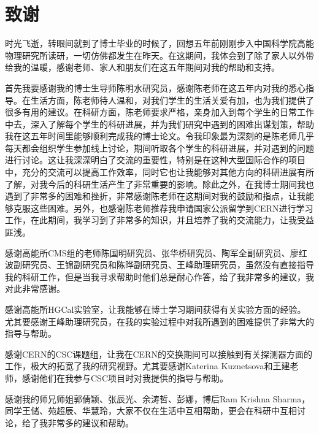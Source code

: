 \chapter[致谢]{致\quad 谢}%

时光飞逝，转眼间就到了博士毕业的时候了，回想五年前刚刚步入中国科学院高能物理研究所读研，一切仿佛都发生在昨天。在这期间，我体会到了除了家人以外带给我的温暖，感谢老师、家人和朋友们在这五年期间对我的帮助和支持。

首先我要感谢我的博士生导师陈明水研究员，感谢陈老师在这五年内对我的悉心指导。在生活方面，陈老师待人温和，对我们学生的生活关爱有加，也为我们提供了很多有用的建议。在科研方面，陈老师要求严格，亲身加入到每个学生的日常工作中去，深入了解每个学生的科研进展，并为我们研究中遇到的困难出谋划策，帮助我在这五年时间里能够顺利完成我的博士论文。令我印象最为深刻的是陈老师几乎每天都会组织学生参加线上讨论，期间听取各个学生的科研进展，并对遇到的问题进行讨论。这让我深深明白了交流的重要性，特别是在这种大型国际合作的项目中，充分的交流可以提高工作效率，同时它也让我能够对其他方向的科研进展有所了解，对我今后的科研生活产生了非常重要的影响。除此之外，在我博士期间我也遇到了非常多的困难和挫折，非常感谢陈老师在这期间对我的鼓励和指点，让我能够克服这些困难。另外，也感谢陈老师推荐我申请国家公派留学到CERN进行学习工作，在此期间，我学习到了非常多的知识，并且培养了我的交流能力，让我受益匪浅。

感谢高能所CMS组的老师陈国明研究员、张华桥研究员、陶军全副研究员、廖红波副研究员、王锦副研究员和陈晔副研究员、王峰助理研究员，虽然没有直接指导我的科研工作，但是当我寻求帮助时他们总是耐心作答，给了我非常多的建议，我对此非常感谢。

感谢高能所HGCal实验室，让我能够在博士学习期间获得有关实验方面的经验。尤其要感谢王峰助理研究员，在我的实验过程中对我所遇到的困难提供了非常大的指导与帮助。

感谢CERN的CSC课题组，让我在CERN的交换期间可以接触到有关探测器方面的工作，极大的拓宽了我的研究视野。尤其要感谢Katerina Kuznetsova和王建老师，感谢他们在我参与CSC项目时对我提供的指导与帮助。

感谢我的师兄师姐郭倩颖、张辰光、余涛哲、彭娜，博后Ram Krishna Sharma，同学王储、苑超辰、华慧玲，大家不仅在生活中互相帮助，更会在科研中互相讨论，给了我非常多的建议和帮助。

